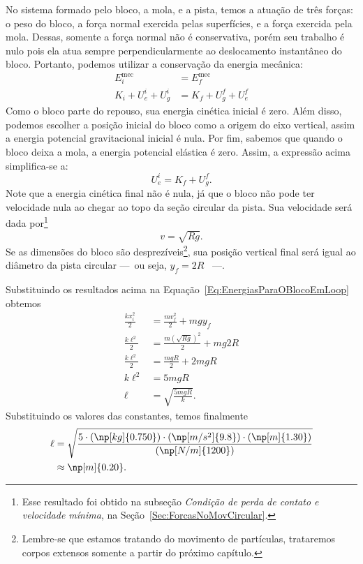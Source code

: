 No sistema formado pelo bloco, a mola, e a pista, temos a atuação de três forças: o peso do bloco, a força normal exercida pelas superfícies, e a força exercida pela mola. Dessas, somente a força normal não é conservativa, porém seu trabalho é nulo pois ela atua sempre perpendicularmente ao deslocamento instantâneo do bloco. Portanto, podemos utilizar a conservação da energia mecânica:
\begin{align}
    E_i^{\textrm{mec}} &= E_f^{\textrm{mec}} \\
    K_i + U_e^i + U_g^i &= K_f + U_g^f + U_e^f
\end{align}
%
Como o bloco parte do repouso, sua energia cinética inicial é zero. Além disso, podemos escolher a posição inicial do bloco como a origem do eixo vertical, assim a energia potencial gravitacional inicial é nula. Por fim, sabemos que quando o bloco deixa a mola, a energia potencial elástica é zero. Assim, a expressão acima simplifica-se a:
\begin{equation}\label{Eq:EnergiasParaOBlocoEmLoop}
    U_e^i = K_f + U_g^f.
\end{equation}
%
Note que a energia cinética final não é nula, já que o bloco não pode ter velocidade nula ao chegar ao topo da seção circular da pista. Sua velocidade será dada por\footnote{Esse resultado foi obtido na subseção \emph{Condição de perda de contato e velocidade mínima}, na Seção~\ref{Sec:ForcasNoMovCircular}.}
\begin{equation}
    v = \sqrt{Rg}.
\end{equation}
%
Se as dimensões do bloco são desprezíveis\footnote{Lembre-se que estamos tratando do movimento de partículas, trataremos corpos extensos somente a partir do próximo capítulo.}, sua posição vertical final será igual ao diâmetro da pista circular ---~ou seja, $y_f = 2R$ ~---.

Substituindo os resultados acima na Equação~\ref{Eq:EnergiasParaOBlocoEmLoop} obtemos
\begin{align}
    \frac{kx_i^2}{2} &= \frac{mv_f^2}{2} + mgy_f \\
    \frac{k\ell^2}{2} &= \frac{m(\sqrt{Rg})^2}{2} + mg2R \\
    \frac{k\ell^2}{2} &= \frac{mgR}{2} + 2mgR \\
    k\ell^2 &= 5mgR \\
    \ell &= \sqrt{\frac{5mgR}{k}}.
\end{align}
%
Substituindo os valores das constantes, temos finalmente
\begin{align}
    \ell &= \sqrt{\frac{5\cdot(\np[kg]{0.750}) \cdot (\np[m/s^2]{9.8}) \cdot (\np[m]{1.30}) }{(\np[N/m]{1200})}} \\
    &\approx \np[m]{0.20}.
\end{align}


